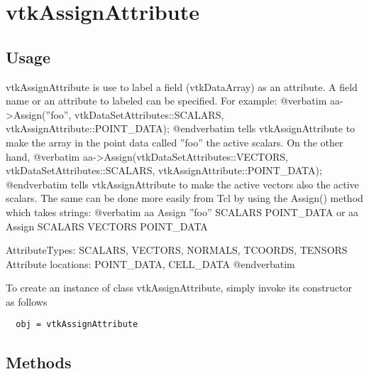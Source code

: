 \section{vtkAssignAttribute}

\subsection{Usage}

 vtkAssignAttribute is use to label a field (vtkDataArray) as an attribute.
 A field name or an attribute to labeled can be specified. For example:
 @verbatim
 aa->Assign(''foo'', vtkDataSetAttributes::SCALARS, 
            vtkAssignAttribute::POINT\_DATA);
 @endverbatim
 tells vtkAssignAttribute to make the array in the point data called
 ''foo'' the active scalars. On the other hand,
 @verbatim
 aa->Assign(vtkDataSetAttributes::VECTORS, vtkDataSetAttributes::SCALARS, 
            vtkAssignAttribute::POINT\_DATA);
 @endverbatim
 tells vtkAssignAttribute to make the active vectors also the active
 scalars. The same can be done more easily from Tcl by using the Assign()
 method which takes strings:
 @verbatim
 aa Assign ''foo'' SCALARS POINT\_DATA 
 or
 aa Assign SCALARS VECTORS POINT\_DATA

 AttributeTypes: SCALARS, VECTORS, NORMALS, TCOORDS, TENSORS
 Attribute locations: POINT\_DATA, CELL\_DATA
 @endverbatim

To create an instance of class vtkAssignAttribute, simply
invoke its constructor as follows
\begin{verbatim}
  obj = vtkAssignAttribute
\end{verbatim}
\subsection{Methods}

